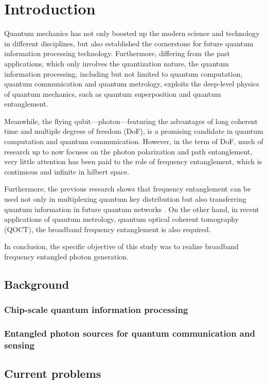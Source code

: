 \chapter{Introduction}
Quantum mechanics has not only boosted up the modern science and technology in different disciplines, but also established the cornerstone for future quantum information processing technology. Furthermore, differing from the past applications, which only involves the quantization nature, the quantum information processing, including but not limited to  quantum computation, quantum communication and quantum metrology, exploits the deep-level physics of quantum mechanics, such as quantum superposition and quantum entanglement.

Meanwhile, the flying qubit---photon---featuring the advantages of long coherent time and multiple degrees of freedom (DoF), is a promising candidate in quantum computation and quantum communication. However, in the term of DoF, much of research up to now focuses on the photon polarization and path entanglement, very little attention has been paid to the role of frequency entanglement, which is continuous and infinite in hilbert space. 

Furthermore, the previous research shows that frequency entanglement can be used not only in multiplexing quantum key distribution \cite{Wengerowsky2018} but also transferring quantum information in future quantum networks \cite{Tchebotareva2019}. On the other hand, in recent applications of quantum metrology, quantum optical coherent tomography (QOCT), the broadband frequency entanglement \cite{Okano2015} is also required. 

In conclusion, the specific objective of this study was to realize broadband frequency entangled photon generation. 


\section{Background}

\subsection{Chip-scale quantum information processing}
\subsection{Entangled photon sources for quantum communication and sensing}

\section{Current problems}